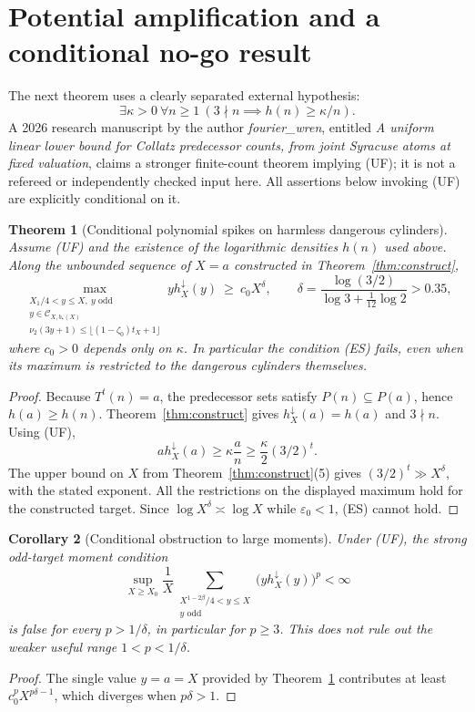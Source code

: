 \documentclass[11pt,a4paper]{article}
\newtheorem{theorem}{Theorem}
\newtheorem{corollary}[theorem]{Corollary}
\newcommand{\calC}{\mathcal C}
\newcommand{\nuTwo}{\nu_2}
\begin{document}
\section{Potential amplification and a conditional no-go result}
The next theorem uses a clearly separated external hypothesis:
\begin{equation}\label{eq:floor}
 \tag{UF} \exists\kappa>0\ \forall n\ge1\ (3\nmid n\implies h(n)\ge\kappa/n).
\end{equation}
A 2026 research manuscript by the author \emph{fourier\_wren}, entitled \emph{A uniform linear lower bound for Collatz predecessor counts, from joint Syracuse atoms at fixed valuation}, claims a stronger finite-count theorem implying (UF); it is not a refereed or independently checked input here.  All assertions below invoking (UF) are explicitly conditional on it.
\begin{theorem}[Conditional polynomial spikes on harmless dangerous cylinders]\label{thm:spikes}
Assume (UF) and the existence of the logarithmic densities $h(n)$ used above.  Along the unbounded sequence of $X=a$ constructed in Theorem~\ref{thm:construct},
\[
 \max_{\substack{X_1/4<y\le X,\ y\text{ odd}\\
       y\in\calC_{X,b_\star(X)}\\
       \nuTwo(3y+1)\le\lfloor(1-\zeta_0)t_X+1\rfloor}}
       y h_X^\downarrow(y)
 \ \ge\ c_0 X^{\delta},
 \qquad \delta=\frac{\log(3/2)}{\log3+\frac1{12}\log2}>0.35,
\]
where $c_0>0$ depends only on $\kappa$.  In particular the condition (ES) fails, even when its maximum is restricted to the dangerous cylinders themselves.
\end{theorem}
\begin{proof}
Because $T^t(n)=a$, the predecessor sets satisfy $P(n)\subseteq P(a)$, hence $h(a)\ge h(n)$.  Theorem~\ref{thm:construct} gives $h_X^\downarrow(a)=h(a)$ and $3\nmid n$.  Using (UF),
\[
  a h_X^\downarrow(a)\ge\kappa\frac an
     \ge\frac\kappa2(3/2)^t.
\]
The upper bound on $X$ from Theorem~\ref{thm:construct}(5) gives $(3/2)^t\gg X^\delta$, with the stated exponent.  All the restrictions on the displayed maximum hold for the constructed target.  Since $\log X^\delta\asymp\log X$ while $\varepsilon_0<1$, (ES) cannot hold.
\end{proof}

\begin{corollary}[Conditional obstruction to large moments]\label{cor:moment}
Under (UF), the strong odd-target moment condition
\[
 \sup_{X\ge X_0}\frac1X\sum_{\substack{X^{1-2\beta}/4<y\le X\\y\text{ odd}}}
 \bigl(y h_X^\downarrow(y)\bigr)^p<\infty
\]
is false for every $p>1/\delta$, in particular for $p\ge3$.  This does \emph{not} rule out the weaker useful range $1<p<1/\delta$.
\end{corollary}
\begin{proof}
The single value $y=a=X$ provided by Theorem~\ref{thm:spikes} contributes at least $c_0^pX^{p\delta-1}$, which diverges when $p\delta>1$.
\end{proof}
\end{document}
